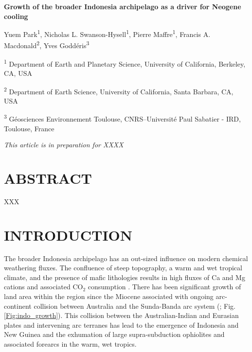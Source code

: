 \documentclass[11pt,letterpaper]{article}
\newcommand{\COtwo}{CO$_{2}$\xspace}
\begin{document}
\begin{flushleft}
{\Large \textbf{Growth of the broader Indonesia archipelago as a driver for Neogene cooling}}

Yuem Park\textsuperscript{1},
Nicholas L. Swanson-Hysell\textsuperscript{1},
Pierre Maffre\textsuperscript{1},
Francis A. Macdonald\textsuperscript{2},
Yves Godd\'eris\textsuperscript{3}

\bigskip
\textsuperscript{1} Department of Earth and Planetary Science, University of California, Berkeley, CA, USA

\textsuperscript{2} Department of Earth Science, University of California, Santa Barbara, CA, USA

\textsuperscript{3} G\'eosciences Environnement Toulouse, CNRS--Universit\'e Paul Sabatier - IRD, Toulouse, France

\bigskip

\end{flushleft}

\noindent\textit{This article is in preparation for XXXX}

\linenumbers

\section*{ABSTRACT \label{sec:ABSTRACT}}

XXX

\section*{INTRODUCTION \label{sec:INTRODUCTION}}

The broader Indonesia archipelago has an out-sized influence on modern chemical weathering fluxes. The confluence of steep topography, a warm and wet tropical climate, and the presence of mafic lithologies results in high fluxes of Ca and Mg cations and associated \COtwo consumption \citep{Hartmann2009a, Hartmann2014a}. There has been significant growth of land area within the region since the Miocene associated with ongoing arc-continent collision between Australia and the Sunda-Banda arc system (\citealp{Molnar2015a}; Fig. \ref{Fig:indo_growth}). This collision between the Australian-Indian and Eurasian plates and intervening arc terranes has lead to the emergence of Indonesia and New Guinea and the exhumation of large supra-subduction ophiolites and associated forearcs in the warm, wet tropics.
\end{document}
